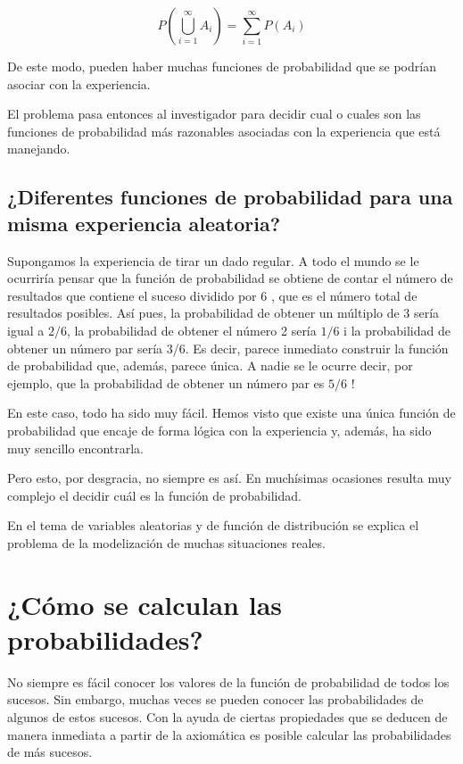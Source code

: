 \documentclass[
  a4paper,
  DIV=11,
  numbers=noendperiod]{scrreprt}
\begin{document}
\[
P\left(\bigcup_{i=1}^{\infty} A_{i}\right)=\sum_{i=1}^{\infty} P\left(A_{i}\right)
\]

De este modo, pueden haber muchas funciones de probabilidad que se
podrían asociar con la experiencia.

El problema pasa entonces al investigador para decidir cual o cuales son
las funciones de probabilidad más razonables asociadas con la
experiencia que está manejando.

\subsection{¿Diferentes funciones de probabilidad para una misma
experiencia
aleatoria?}\label{diferentes-funciones-de-probabilidad-para-una-misma-experiencia-aleatoria}

Supongamos la experiencia de tirar un dado regular. A todo el mundo se
le ocurriría pensar que la función de probabilidad se obtiene de contar
el número de resultados que contiene el suceso dividido por 6 , que es
el número total de resultados posibles. Así pues, la probabilidad de
obtener un múltiplo de 3 sería igual a \(2 / 6\), la probabilidad de
obtener el número 2 sería \(1 / 6\) i la probabilidad de obtener un
número par sería 3/6. Es decir, parece inmediato construir la función de
probabilidad que, además, parece única. A nadie se le ocurre decir, por
ejemplo, que la probabilidad de obtener un número par es \(5 / 6\) !

En este caso, todo ha sido muy fácil. Hemos visto que existe una única
función de probabilidad que encaje de forma lógica con la experiencia y,
además, ha sido muy sencillo encontrarla.

Pero esto, por desgracia, no siempre es así. En muchísimas ocasiones
resulta muy complejo el decidir cuál es la función de probabilidad.

En el tema de variables aleatorias y de función de distribución se
explica el problema de la modelización de muchas situaciones reales.

\section{¿Cómo se calculan las
probabilidades?}\label{cuxf3mo-se-calculan-las-probabilidades}

No siempre es fácil conocer los valores de la función de probabilidad de
todos los sucesos. Sin embargo, muchas veces se pueden conocer las
probabilidades de algunos de estos sucesos. Con la ayuda de ciertas
propiedades que se deducen de manera inmediata a partir de la axiomática
es posible calcular las probabilidades de más sucesos.
\end{document}
